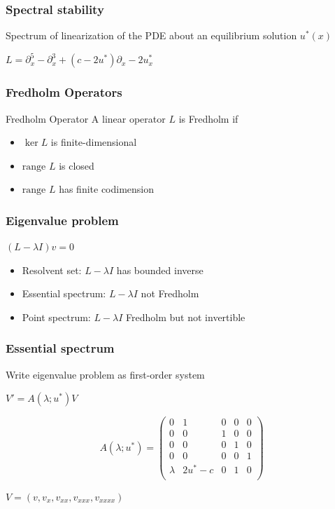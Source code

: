 \documentclass[16pt]{beamer}
\begin{document}
\begin{frame}
	\frametitle{Spectral stability}
	\fontsize{16}{7.2}\selectfont
	Spectrum of linearization of the PDE about an equilibrium solution $u^*(x)$

	\begin{center}
		$L = \partial_x^5 - \partial_x^3 + (c - 2 u^*)\partial_x - 2 u^*_x $
	\end{center}
\end{frame}

\begin{frame}
	\frametitle{Fredholm Operators}
	\fontsize{16}{7.2}\selectfont
	\begin{block}{Fredholm Operator}
	A linear operator $L$ is Fredholm if
	\begin{itemize}
	\item $\ker L$ is finite-dimensional
	\item $\text{range } L$ is closed
	\item $\text{range } L$ has finite codimension
	\end{itemize}
	\end{block}
\end{frame}

\begin{frame}
	\frametitle{Eigenvalue problem}
	\fontsize{16}{7.2}\selectfont
	\begin{center}
		$(L - \lambda I )v = 0$
	\end{center}
	\begin{itemize}
	\item Resolvent set: $L - \lambda I$ has bounded inverse
	\vspace{0.5cm}
	\item Essential spectrum: $L - \lambda I$ not Fredholm
	\vspace{0.5cm}
	\item Point spectrum: $L - \lambda I$ Fredholm but not invertible
	\end{itemize}
\end{frame}

\begin{frame}
	\frametitle{Essential spectrum}
	\fontsize{16}{7.2}\selectfont
	Write eigenvalue problem as first-order system
	\begin{center}
		$V' = A(\lambda; u^*)V$
	\end{center}
	\begin{center}
	\[
		A(\lambda;u^*) = 
		\begin{pmatrix}
		0 & 1 & 0 & 0 & 0\\
		0 & 0 & 1 & 0 & 0\\
		0 & 0 & 0 & 1 & 0\\
		0 & 0 & 0 & 0 & 1\\
		\lambda & 2u^* - c & 0 & 1 & 0 \\ 
		\end{pmatrix}
	\]
	\end{center}
	\begin{center}
		$V = (v,v_x, v_{xx}, v_{xxx},v_{xxxx})$
	\end{center}
\end{frame}
\end{document}
